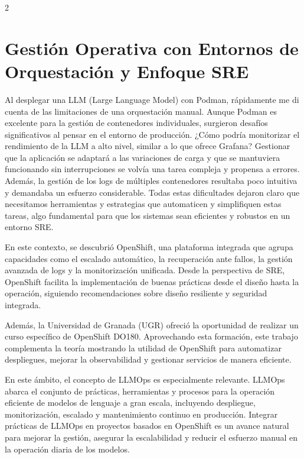 \begin{multicols*}{2}

    \chapter{Gestión Operativa con Entornos de Orquestación y Enfoque SRE}
Al desplegar una LLM (Large Language Model) con Podman, rápidamente me di cuenta de las limitaciones de una orquestación manual. Aunque Podman es excelente para la gestión de contenedores individuales, surgieron desafíos significativos al pensar en el entorno de producción. ¿Cómo podría monitorizar el rendimiento de la LLM a alto nivel, similar a lo que ofrece Grafana? Gestionar que la aplicación se adaptará a las variaciones de carga y que se mantuviera funcionando sin interrupciones se volvía una tarea compleja y propensa a errores. Además, la gestión de los logs de múltiples contenedores resultaba poco intuitiva y demandaba un esfuerzo considerable. Todas estas dificultades dejaron claro que necesitamos herramientas y estrategias que automaticen y simplifiquen estas tareas, algo fundamental para que los sistemas sean eficientes y robustos en un entorno SRE.

     En este contexto, se descubrió OpenShift, una plataforma integrada que agrupa capacidades como el escalado automático, la recuperación ante fallos, la gestión avanzada de logs y la monitorización unificada. Desde la perspectiva de SRE, OpenShift facilita la implementación de buenas prácticas desde el diseño hasta la operación, siguiendo recomendaciones sobre diseño resiliente y seguridad integrada.

     Además, la Universidad de Granada (UGR) ofreció la oportunidad de realizar un curso específico de OpenShift DO180. Aprovechando esta formación, este trabajo complementa la teoría mostrando la utilidad de OpenShift para automatizar despliegues, mejorar la observabilidad y gestionar servicios de manera eficiente.

     En este ámbito, el concepto de LLMOps es especialmente relevante. LLMOps abarca el conjunto de prácticas, herramientas y procesos para la operación eficiente de modelos de lenguaje a gran escala, incluyendo despliegue, monitorización, escalado y mantenimiento continuo en producción. Integrar prácticas de LLMOps en proyectos basados en OpenShift es un avance natural para mejorar la gestión, asegurar la escalabilidad y reducir el esfuerzo manual en la operación diaria de los modelos.


\vspace{\baselineskip}


\end{multicols*}
